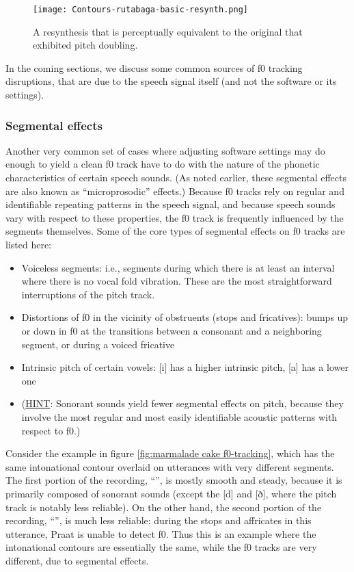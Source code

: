 \begin{figure}[H]
\centering
%
\texttt{[image: Contours-rutabaga-basic-resynth.png]}
%
\caption{A resynthesis that is perceptually equivalent to the original that exhibited pitch doubling.%
\label{fig:rutabaga-resynth f0-tracking}%
%
}
\end{figure}

In the coming sections, we discuss some common sources of f0 tracking disruptions, that are due to the speech signal itself (and not the software or its settings).

\subsubsection{Segmental effects}\label{sec:segmental-effects}

Another very common set of cases where adjusting software settings may do enough to yield a clean f0 track have to do with the nature of the phonetic characteristics of certain speech sounds. (As noted earlier, these segmental effects are also known as “microprosodic” effects.) Because f0 tracks rely on regular and identifiable repeating patterns in the speech signal, and because speech sounds vary with respect to these properties, the f0 track is frequently influenced by the segments themselves. Some of the core types of segmental effects on f0 tracks are listed here:

\begin{itemize}
\item Voiceless segments: i.e., segments during which there is at least an interval where there is no vocal fold vibration. These are the most straightforward interruptions of the pitch track.
\item Distortions of f0 in the vicinity of obstruents (stops and fricatives): bumps up or down in f0 at the transitions between a consonant and a neighboring segment, or during a voiced fricative
\item Intrinsic pitch of certain vowels: [i] has a higher intrinsic pitch, [a] has a lower one 
\item[] (\uline{HINT}: Sonorant sounds yield fewer segmental effects on pitch, because they involve the most regular and most easily identifiable acoustic patterns with respect to f0.)
\end{itemize}

Consider the example in figure \ref{fig:marmalade cake f0-tracking}, which has the same intonational contour overlaid on utterances with very different segments. The first portion of the recording, “”, is mostly smooth and steady, because it is primarily composed of sonorant sounds (except the [d] and [ð], where the pitch track is notably less reliable). On the other hand, the second portion of the recording, “”, is much less reliable: during the stops and affricates in this utterance, Praat is unable to detect f0. Thus this is an example where the intonational contours are essentially the same, while the f0 tracks are very different, due to segmental effects.

